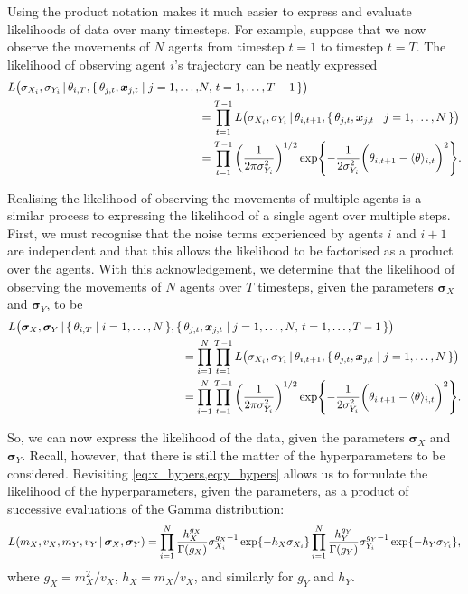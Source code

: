 Using the product notation makes it much easier to express and evaluate likelihoods of data over many timesteps. For example, suppose that we now observe the movements of $N$ agents from timestep $t=1$ to timestep $t=T$. The likelihood of observing agent $i$'s trajectory can be neatly expressed
\begin{align*}
	L\big(\sigma_{X_i}, \sigma_{Y_i}  \,|\, \theta_{i, T},  \{\,\theta_{j, t}, \bm{x}_{j, t} \mid j= 1,\ldots,&N, \, t=1,  \ldots,T-1\,\}\big) \\
	& = \prod_{t=1}^{T-1} L\big(\sigma_{X_i}, \sigma_{Y_i} \,|\, \theta_{i, t+1},  \{\,\theta_{j, t}, \bm{x}_{j, t} \mid j=1,\ldots,N\,\}\big) \\
	& = \prod_{t=1}^{T-1} \bigg( \frac{1}{2\pi\sigma_{Y_i}^2} \bigg)^{1/2} \exp{-\frac{1}{2\sigma_{Y_i}^2} \bigg(\theta_{i, t+1} - \langle \theta \rangle_{i, t}\bigg)^2 }.
\end{align*}

Realising the likelihood of observing the movements of multiple agents is a similar process to expressing the likelihood of a single agent over multiple steps. First, we must recognise that the noise terms experienced by agents $i$ and $i+1$ are independent and that this allows the likelihood to be factorised as a product over the agents. With this acknowledgement, we determine that the likelihood of observing the movements of $N$ agents over $T$ timesteps, given the parameters $\bm{\sigma}_X$ and $\bm{\sigma}_Y$, to be
\begin{align}
\label{eq:data_likelihood}
\begin{split}
	L\big(\bm{\sigma}_X, \bm{\sigma}_Y  \,|\, \{\,\theta_{i, T} \mid i=1,\ldots,N\,\},  \{&\,\theta_{j, t}, \bm{x}_{j, t} \mid j= 1,\ldots, N, \, t=1,  \ldots,T-1\,\}\big) \\
	& = \prod_{i=1}^N \prod_{t=1}^{T-1} L\big(\sigma_{X_i}, \sigma_{Y_i} \,|\, \theta_{i, t+1},  \{\,\theta_{j, t}, \bm{x}_{j, t} \mid j=1,\ldots,N\,\}\big) \\
	& = \prod_{i=1}^N \prod_{t=1}^{T-1} \bigg( \frac{1}{2\pi\sigma_{Y_i}^2} \bigg)^{1/2} \exp{-\frac{1}{2\sigma_{Y_i}^2} \bigg(\theta_{i, t+1} - \langle \theta \rangle_{i, t}\bigg)^2 }.
\end{split}
\end{align}

So, we can now express the likelihood of the data, given the parameters $\bm{\sigma}_X$ and $\bm{\sigma}_Y$. Recall, however, that there is still the matter of the hyperparameters to be considered. Revisiting \cref{eq:x_hypers,eq:y_hypers} allows us to formulate the likelihood of the hyperparameters, given the parameters, as a product of successive evaluations of the Gamma distribution:
\begin{equation}
\label{eq:param_likelihood}
	L(m_X, v_X, m_Y, v_Y \,|\, \bm{\sigma}_X, \bm{\sigma}_Y) = \prod_{i=1}^N \frac{h_X^{g_X}}{\Gamma(g_X)} \sigma_{X_i}^{g_X - 1} \exp{-h_X \sigma_{X_i}}  \prod_{i=1}^N \frac{h_Y^{g_Y}}{\Gamma(g_Y)} \sigma_{Y_i}^{g_Y - 1} \exp{-h_Y \sigma_{Y_i}},
\end{equation}
where $g_X = m_X^2 / v_X$, $h_X = m_X / v_X$, and similarly for $g_Y$ and $h_Y$.

